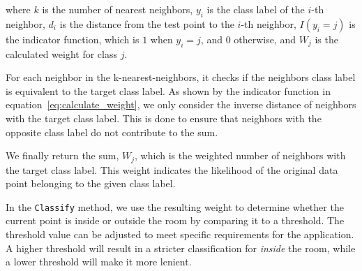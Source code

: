 where $k$ is the number of nearest neighbors, $y_i$ is the class label of the $i$-th neighbor, $d_i$ is the distance from the test point to the $i$-th neighbor, $I(y_i=j)$ is the indicator function, which is $1$ when $y_i=j$, and $0$ otherwise, and $W_j$ is the calculated weight for class $j$.

For each neighbor in the k-nearest-neighbors, it checks if the neighbors class label is equivalent to the target class label. As shown by the indicator function in equation~\ref{eq:calculate_weight}, we only consider the inverse distance of neighbors with the target class label. This is done to ensure that neighbors with the opposite class label do not contribute to the sum.

We finally return the sum, $W_j$, which is the weighted number of neighbors with the target class label. This weight indicates the likelihood of the original data point belonging to the given class label.

In the \texttt{Classify} method, we use the resulting weight to determine whether the current point is inside or outside the room by comparing it to a threshold.
The threshold value can be adjusted to meet specific requirements for the application. A higher threshold will result in a stricter classification for \textit{inside} the room, while a lower threshold will make it more lenient.
